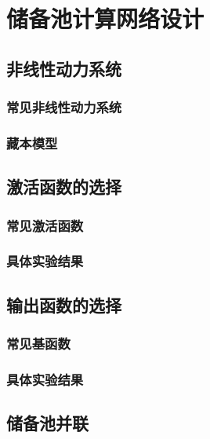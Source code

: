 \documentclass[notitlepage,cs4size,punct,oneside]{ctexrep}
\numberwithin{equation}{chapter}
\theoremstyle{mystyle}
\begin{document}

\chapter{储备池计算网络设计}

\section{非线性动力系统}

\subsection{常见非线性动力系统}

\subsection{藏本模型}

\section{激活函数的选择}

\subsection{常见激活函数}

\subsection{具体实验结果}

\section{输出函数的选择}

\subsection{常见基函数}

\subsection{具体实验结果}

\section{储备池并联}
\end{document}
